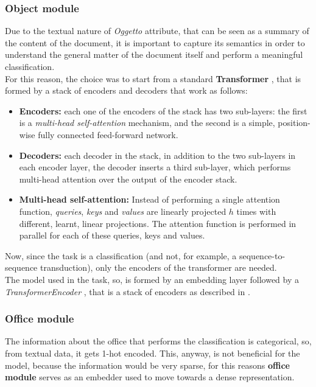 \documentclass[12pt]{article}
\begin{document}
\subsubsection{Object module}\label{sec:object-module}
Due to the textual nature of \textit{Oggetto} attribute, that can be seen as a summary of the content of the document, it is important to capture its semantics in order to understand the general matter of the document itself and perform a meaningful classification.\\
For this reason, the choice was to start from a standard \textbf{Transformer} \cite{attention_is_all_you_need, pytorch_transformer}, that is formed by a stack of encoders and decoders that work as follows:
\begin{itemize}
    \item \textbf{Encoders:} each one of the encoders of the stack has two sub-layers: the first is a \textit{multi-head self-attention} mechanism, and the second is a simple, position-wise fully connected feed-forward network.
    \item \textbf{Decoders:} each decoder in the stack, in addition to the two sub-layers in each encoder layer, the decoder inserts a third sub-layer, which performs multi-head attention over the output of the encoder stack.
    \item \textbf{Multi-head self-attention:} Instead of performing a single attention function, \textit{queries}, \textit{keys} and \textit{values} are linearly projected $h$ times with different, learnt, linear projections. The attention function is performed in parallel for each of these queries, keys and values.
\end{itemize}
Now, since the task is a classification (and not, for example, a sequence-to-sequence transduction), only the encoders of the transformer are needed.\\
The model used in the task, so, is formed by an embedding layer \cite{pytorch_embedding} followed by a \textit{TransformerEncoder} \cite{pytorch_transformerencoder}, that is a stack of encoders as described in \cite{attention_is_all_you_need}.

\subsubsection{Office module}\label{sec:office-module}
The information about the office that performs the classification is categorical, so, from textual data, it gets 1-hot encoded.
This, anyway, is not beneficial for the model, because the information would be very sparse, for this reasons \textbf{office module} serves as an embedder used to move towards a dense representation.
\end{document}
